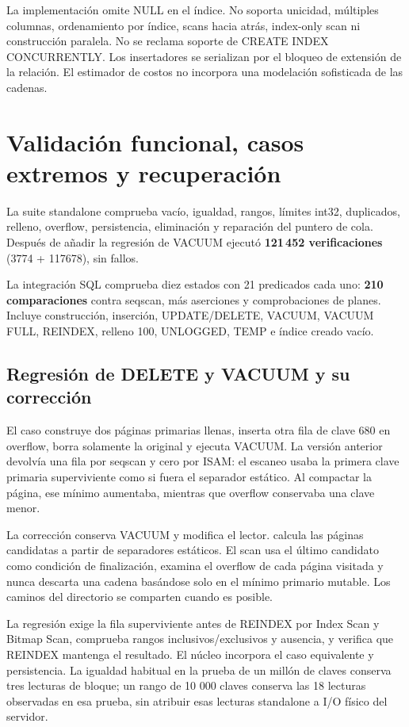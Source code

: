 \documentclass[11pt,a4paper]{article}
\newcommand{\code}[1]{\texttt{\detokenize{#1}}}
\begin{document}
La implementación omite NULL en el índice. No soporta unicidad, múltiples
columnas, ordenamiento por índice, scans hacia atrás, index-only scan ni
construcción paralela. No se reclama soporte de CREATE INDEX CONCURRENTLY. Los
insertadores se serializan por el bloqueo de extensión de la relación. El
estimador de costos no incorpora una modelación sofisticada de las cadenas.

\section{Validación funcional, casos extremos y recuperación}
La suite standalone comprueba vacío, igualdad, rangos, límites int32, duplicados,
relleno, overflow, persistencia, eliminación y reparación del puntero de cola.
Después de añadir la regresión de VACUUM ejecutó \textbf{121\,452 verificaciones}
(3774 + 117678), sin fallos.

La integración SQL comprueba diez estados con 21 predicados cada uno:
\textbf{210 comparaciones} contra seqscan, más aserciones y comprobaciones de
planes. Incluye construcción, inserción, UPDATE/DELETE, VACUUM, VACUUM FULL,
REINDEX, relleno 100, UNLOGGED, TEMP e índice creado vacío.

\subsection{Regresión de DELETE y VACUUM y su corrección}
El caso \code{tests/sql/caso-vacuum.sql} construye dos páginas primarias llenas,
inserta otra fila de clave 680 en overflow, borra solamente la original y ejecuta
VACUUM. La versión anterior devolvía una fila por seqscan y cero por ISAM: el
escaneo usaba la primera clave primaria superviviente como si fuera el separador
estático. Al compactar la página, ese mínimo aumentaba, mientras que overflow
conservaba una clave menor.

La corrección conserva VACUUM y modifica el lector. \code{isam_index_range_blocks}
calcula las páginas candidatas a partir de separadores estáticos. El scan usa el
último candidato como condición de finalización, examina el overflow de cada
página visitada y nunca descarta una cadena basándose solo en el mínimo primario
mutable. Los caminos del directorio se comparten cuando es posible.

La regresión exige la fila superviviente antes de REINDEX por Index Scan y Bitmap
Scan, comprueba rangos inclusivos/exclusivos y ausencia, y verifica que REINDEX
mantenga el resultado. El núcleo incorpora el caso equivalente y persistencia.
La igualdad habitual en la prueba de un millón de claves conserva tres lecturas
de bloque; un rango de 10 000 claves conserva las 18 lecturas observadas en esa
prueba, sin atribuir esas lecturas standalone a I/O físico del servidor.
\end{document}

